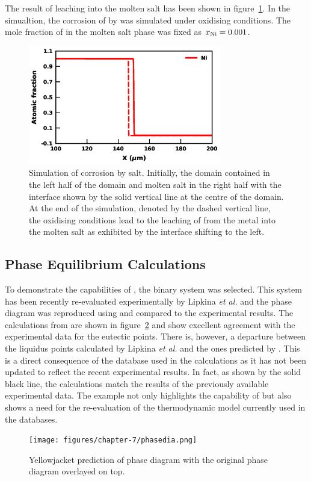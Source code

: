 The result of  leaching into the molten salt has been shown in figure~\ref{fig:pfres}. In the simualtion, the corrosion of  by  was simulated under oxidising conditions. The mole fraction of  in the molten salt phase was fixed as $x_{\ce{Ni}} = 0.001$.
\begin{figure}[h!]
        \centering
        \includegraphics[width=0.75\textwidth]{figures/chapter-7/pfres.png}
        \caption{Simulation of  corrosion by  salt. Initially, the domain contained  in the left half of the domain and molten salt in the right half with the interface shown by the solid vertical line at the centre of the domain. At the end of the simulation, denoted by the dashed vertical line, the oxidising conditions lead to the leaching of  from the metal into the molten salt as exhibited by the interface shifting to the left.}
        \label{fig:pfres}
    \end{figure}
       
\subsection{Phase Equilibrium Calculations}
    To demonstrate the capabilities of {\GEM}, the  binary system was selected. This system has been recently re-evaluated experimentally by Lipkina \textit{et al.} \cite{Lipkina:2022aa1} and the phase diagram was reproduced using {\GEM} and compared to the experimental results. The calculations from {\YJ} are shown in figure~\ref{fig:res_phased} and show excellent agreement with the experimental data for the eutectic points. There is, however, a departure between the liquidus points calculated by Lipkina \textit{et al.} and the ones predicted by {\YJ}. This is a direct consequence of the database used in the calculations as it has not been updated to reflect the recent experimental results. In fact, as shown by the solid black line, the calculations match the results of the previously available experimental data. The example not only highlights the capability of {\GEM} but also shows a need for the re-evaluation of the  thermodynamic model currently used in the databases.
\begin{figure}
         \centering
         \texttt{[image: figures/chapter-7/phasedia.png]}
 	 \caption{Yellowjacket prediction of  phase diagram with the original phase diagram overlayed on top.}
	 \label{fig:res_phased}
\end{figure}
    
